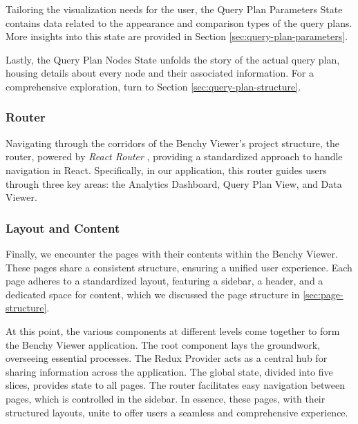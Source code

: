 Tailoring the visualization needs for the user, the Query Plan Parameters State contains data related to the appearance and comparison types of the query plans. More insights into this state are provided in Section \ref{sec:query-plan-parameters}.

Lastly, the Query Plan Nodes State unfolds the story of the actual query plan, housing details about every node and their associated information. For a comprehensive exploration, turn to Section \ref{sec:query-plan-structure}.


\subsubsection{Router}
Navigating through the corridors of the Benchy Viewer's project structure, the router, powered by \textit{React Router} \parencite{react-router}, providing a standardized approach to handle navigation in React. Specifically, in our application, this router guides users through three key areas: the Analytics Dashboard, Query Plan View, and Data Viewer.

\subsubsection{Layout and Content}
Finally, we encounter the pages with their contents within the Benchy Viewer. These pages share a consistent structure, ensuring a unified user experience. Each page adheres to a standardized layout, featuring a sidebar, a header, and a dedicated space for content, which we discussed the page structure in \ref{sec:page-structure}.

At this point, the various components at different levels come together to form the Benchy Viewer application. The root component lays the groundwork, overseeing essential processes. The Redux Provider acts as a central hub for sharing information across the application. The global state, divided into five slices, provides state to all pages. The router facilitates easy navigation between pages, which is controlled in the sidebar. In essence, these pages, with their structured layouts, unite to offer users a seamless and comprehensive experience.














